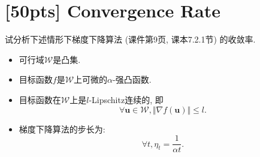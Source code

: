 \documentclass[a4paper,UTF8]{article}
\numberwithin{equation}{section}
\begin{document}
	\newpage 
	
	\section{[50pts] Convergence Rate}
	
	\noindent 试分析下述情形下梯度下降算法 (课件第9页, 课本7.2.1节) 的收敛率. 
	\begin{itemize}
		\item 可行域$\mathcal{W}$是凸集. 
		\item 目标函数$f$是$\mathcal{W}$上可微的$\alpha$-强凸函数. 
		\item 目标函数在$\mathcal{W}$上是$l$-Lipschitz连续的, 即
		\begin{equation}
			\forall \bm{u} \in \mathcal{W} , \Vert \nabla f(\bm{u}) \Vert \leqslant l . 
		\end{equation}
		\item 梯度下降算法的步长为: 
		\begin{equation}
			\forall t , \eta_t = \frac{1}{\alpha t} . 
		\end{equation}
	\end{itemize}
	
\end{document}
